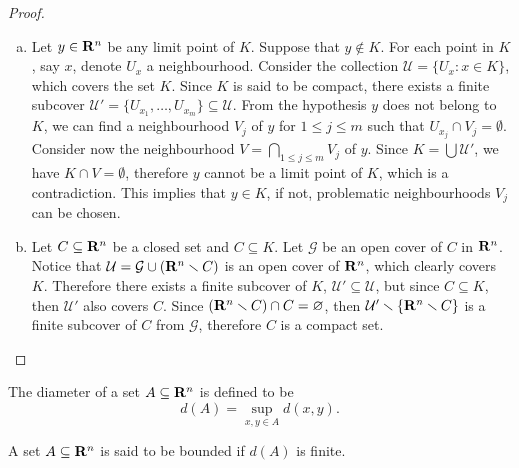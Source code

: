 \begin{proof}
    \begin{enumerate}[(a)]
        \item Let \(y \in \mathbf{R}^n\) be any limit point of \(K\). Suppose that \(y
              \not\in K\). For each point in \(K\), say \(x\), denote \(U_x\) a
              neighbourhood. Consider the collection \(\mathcal U = \{U_x \colon x \in K\}\),
              which covers the set \(K\). Since \(K\) is said to be compact, there
              exists a finite subcover \(\mathcal U' = \{U_{x_1}, \dots, U_{x_m}\}
              \subseteq \mathcal U\). From the hypothesis \(y\) does not belong to
              \(K\), we can find a neighbourhood \(V_j\) of \(y\) for \(1 \leq j \leq
              m\) such that \(U_{x_j} \cap V_j = \emptyset\). Consider now the
              neighbourhood \(V = \bigcap_{1 \leq j \leq m} V_j\) of \(y\). Since \(K =
              \bigcup \mathcal U'\), we have \(K \cap V = \emptyset\), therefore \(y\)
              cannot be a limit point of \(K\), which is a contradiction. This implies
              that \(y \in K\), if not, problematic neighbourhoods \(V_j\) can be
              chosen.
        \item Let \(C \subseteq \mathbf{R}^n\) be a closed set and \(C \subseteq K\). Let
              \(\mathcal G\) be an open cover of \(C\) in \(\mathbf{R}^n\). Notice that
              \(\mathcal U = \mathcal G \cup (\mathbf{R}^n \smallsetminus C)\) is an open cover of
              \(\mathbf{R}^n\), which clearly covers \(K\). Therefore there exists a finite
              subcover of \(K\), \(\mathcal U' \subseteq \mathcal U\), but since \(C
              \subseteq K\), then \(\mathcal U'\) also covers \(C\). Since \((\mathbf{R}^n
              \smallsetminus C) \cap C = \varnothing\), then \(\mathcal U' \smallsetminus \{\mathbf{R}^n
              \smallsetminus C\}\) is a finite subcover of \(C\) from \(\mathcal G\),
              therefore \(C\) is a compact set.
    \end{enumerate}
\end{proof}

\begin{definition}\label{def:Rn-diameter}
    The diameter of a set \(A \subseteq \mathbf{R}^n\) is defined to be
    \[
        d(A) = \sup_{x, y \in A} d(x, y).
    \]
\end{definition}

\begin{definition}\label{def: bounded}
    A set \(A \subseteq \mathbf{R}^n\) is said to be bounded if \(d(A)\) is finite.
\end{definition}

